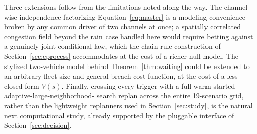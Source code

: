 \documentclass[trsc,dblanonrev]{informs4}
\begin{document}
Three extensions follow from the limitations noted along the way. The
channel-wise independence factorizing Equation~\eqref{eq:master} is a
modeling convenience broken by any common driver of two channels at
once; a spatially correlated congestion field beyond the rain case
handled here would require betting against a genuinely joint
conditional law, which the chain-rule construction of
Section~\ref{sec:eprocess} accommodates at the cost of a richer null
model. The stylized two-vehicle model behind Theorem~\ref{thm:waiting}
could be extended to an arbitrary fleet size and general breach-cost
function, at the cost of a less closed-form $V(s)$. Finally, crossing
every trigger with a full warm-started adaptive-large-neighborhood-
search replan across the entire 19-scenario grid, rather than the
lightweight replanners used in Section~\ref{sec:study}, is the natural
next computational study, already supported by the pluggable interface
of Section~\ref{sec:decision}.

\end{document}
